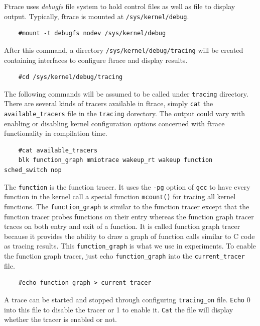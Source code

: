 Ftrace uses \emph{debugfs} file system to hold control files as well as
file to display output. 
Typically, ftrace is mounted at \texttt{/sys/kernel/debug}.
\begin{lstlisting}
	#mount -t debugfs nodev /sys/kernel/debug
\end{lstlisting}
After this command, a directory \texttt{/sys/kernel/debug/tracing} will 
be created containing interfaces to configure ftrace and display results.
\begin{lstlisting}
	#cd /sys/kernel/debug/tracing
\end{lstlisting}
The following commands will be assumed to be called under \texttt{tracing}
directory.
There are several kinds of tracers available in ftrace, simply \texttt{cat} 
the \texttt{available\_tracers} file in the \texttt{tracing} dorectory.
The output could vary with enabling or disabling kernel configuration 
options concerned with ftrace functionality in compilation time.
\begin{lstlisting}
	#cat available_tracers
	blk function_graph mmiotrace wakeup_rt wakeup function sched_switch nop
\end{lstlisting}
The \texttt{function} is the function tracer. It uses the \texttt{-pg} option
of \texttt{gcc} to have every function in the kernel call a special function
\texttt{mcount()} for tracing all kernel functions. 
The \texttt{function\_graph} is similar to the function tracer except that
the function tracer probes functions on their entry whereas the function 
graph tracer traces on both entry and exit of a function. It is called 
function graph tracer because it provides the ability to draw a graph 
of function calls similar to C code as tracing results. 
This \texttt{function\_graph} is what we use in experiments. 
To enable the function graph tracer, just echo \texttt{function\_graph} 
into the \texttt{current\_tracer} file.
\begin{lstlisting}
	#echo function_graph > current_tracer
\end{lstlisting}
A trace can be started and stopped through configuring \texttt{tracing\_on}
file. \texttt{Echo} 0 into this file to disable the tracer or 1 to enable it. 
\texttt{Cat} the file will display whether the tracer is enabled or not.


